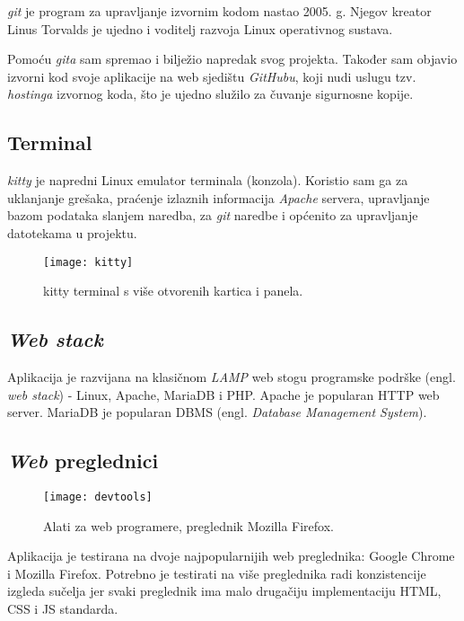     \textit{git} je program za upravljanje izvornim kodom nastao 2005. g.
    Njegov kreator Linus Torvalds je ujedno i voditelj razvoja Linux
    operativnog sustava.

    Pomoću \textit{gita} sam spremao i bilježio napredak svog projekta.
    Također sam objavio izvorni kod svoje aplikacije na web sjedištu
    \textit{GitHubu}, koji nudi uslugu tzv. \textit{hostinga} izvornog koda,
    što je ujedno služilo za čuvanje sigurnosne kopije.

  \subsection{Terminal}

    \textit{kitty} je napredni Linux emulator terminala (konzola). Koristio sam
    ga za uklanjanje grešaka, praćenje izlaznih informacija \textit{Apache}
    servera, upravljanje bazom podataka slanjem naredba, za \textit{git} naredbe
    i općenito za upravljanje datotekama u projektu.

    \begin{figure}[h]
      \texttt{[image: kitty]}
      \caption{kitty terminal s više otvorenih kartica i panela.}
    \end{figure}

  \subsection{\textit{Web stack}}

    Aplikacija je razvijana na klasičnom \textit{LAMP} web stogu programske
    podrške (engl. \textit{web stack}) - Linux, Apache, MariaDB i PHP. Apache je
    popularan HTTP web server. MariaDB je popularan DBMS (engl. \textit{Database
    Management System}).

  \subsection{\textit{Web} preglednici}

    \begin{wrapfigure}{r}{0.5\textwidth}
      \texttt{[image: devtools]}
      \caption{Alati za web programere, preglednik Mozilla Firefox.}
    \end{wrapfigure}

    Aplikacija je testirana na dvoje najpopularnijih web preglednika: Google
    Chrome i Mozilla Firefox. Potrebno je testirati na više preglednika radi
    konzistencije izgleda sučelja jer svaki preglednik ima malo drugačiju
    implementaciju HTML, CSS i JS standarda.

